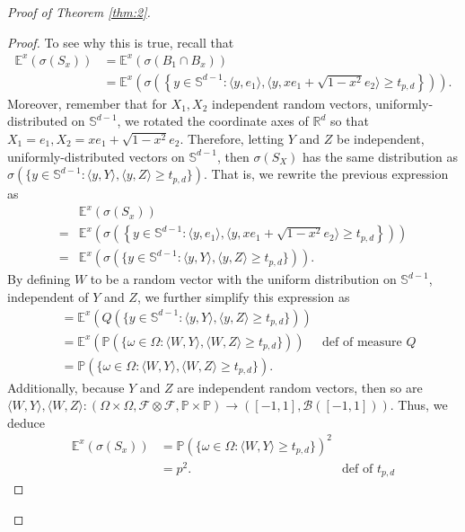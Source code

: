 \documentclass{article}
\begin{document}
\begin{proof}[Proof of Theorem \ref{thm:2}]
\begin{proof}
To see why this is true, recall that 
\begin{align*}
    \mathbb{E}^x(\sigma(S_x)) &= \mathbb{E}^x(\sigma(B_1 \cap B_x))\\ &= \mathbb{E}^x \left(\sigma\left(\left\{ y \in \mathbb{S}^{d-1} : \langle y, e_1 \rangle,   \langle y, xe_1 + \sqrt{1-x^2}e_2 \rangle \geq t_{p,d} \right\} \right) \right).
\end{align*}
Moreover, remember that for $X_1, X_2$ independent random vectors, uniformly-distributed on $\mathbb{S}^{d-1}$, we rotated the coordinate axes of $\mathbb{R}^d$ so that $X_1 = e_1, X_2 = xe_1 + \sqrt{1-x^2}e_2$. Therefore, letting $Y$ and $Z$ be independent, uniformly-distributed vectors on $\mathbb{S}^{d-1}$, then $\sigma(S_X)$ has the same distribution as $\sigma(\{y \in \mathbb{S}^{d-1}: \langle y, Y \rangle, \langle y, Z \rangle \geq t_{p,d} \})$. That is, we rewrite the previous expression as 
\begin{align*}
   &\mathbb{E}^x(\sigma(S_x))\\
   =& \mathbb{E}^x \left(\sigma\left(\left\{ y \in \mathbb{S}^{d-1} : \langle y, e_1 \rangle,   \langle y, xe_1 + \sqrt{1-x^2}e_2 \rangle \geq t_{p,d} \right\} \right) \right)\\
   =& \mathbb{E}^x \left( \sigma(\{y \in \mathbb{S}^{d-1}: \langle y, Y \rangle, \langle y, Z \rangle \geq t_{p,d} \}) \right).
\end{align*}
By defining $W$ to be a random vector with the uniform distribution on $\mathbb{S}^{d-1}$, independent of $Y$ and $Z$, we further simplify this expression as
\begin{align*}
    &= \mathbb{E}^x \left(Q \left(\{ y \in \mathbb{S}^{d-1} : \langle y, Y \rangle,  \langle y, Z \rangle \geq t_{p,d} \}\right) \right)\\
    &= \mathbb{E}^x \left( \mathbb{P} \left(\{ \omega \in \Omega: \langle W, Y \rangle, \langle W, Z \rangle \geq t_{p,d} \}\right) \right) & \text{def of measure $Q$}\\
    &= \mathbb{P} \left(\{ \omega \in \Omega: \langle W, Y \rangle,  \langle W, Z \rangle \geq t_{p,d} \}\right).
\end{align*}
Additionally, because $Y$ and $Z$ are independent random vectors, then so are $\langle W, Y \rangle, \langle W, Z \rangle : (\Omega \times \Omega, \mathcal{F} \otimes \mathcal{F}, \mathbb{P} \times \mathbb{P}) \rightarrow ([-1,1], \mathcal{B}([-1,1]))$. Thus, we deduce 
\begin{align*}
    \mathbb{E}^x(\sigma(S_x)) &=  \mathbb{P} \left(\{ \omega \in \Omega : \langle W, Y \rangle \geq t_{p,d} \} \right)^2\\
    &= p^2. & \text{def of $t_{p,d}$}
\end{align*}


\end{proof}
\end{proof}
\end{document}
